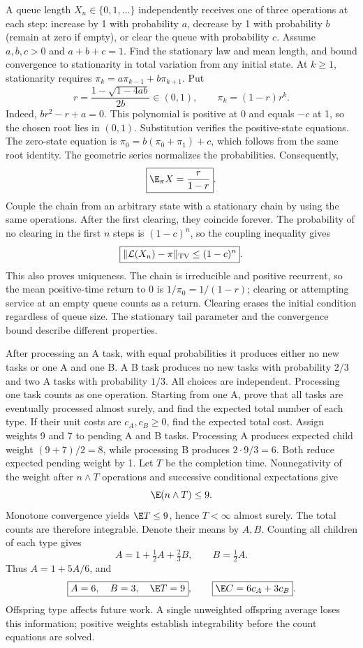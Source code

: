A queue length $X_n\in\{0,1,\ldots\}$ independently receives one of three operations at each step: increase by 1 with probability $a$, decrease by 1 with probability $b$ (remain at zero if empty), or clear the queue with probability $c$. Assume $a,b,c>0$ and $a+b+c=1$. Find the stationary law and mean length, and bound convergence to stationarity in total variation from any initial state.
\solution At $k\ge1$, stationarity requires $\pi_k=a\pi_{k-1}+b\pi_{k+1}$. Put
\[
 r=\frac{1-\sqrt{1-4ab}}{2b}\in(0,1),
 \qquad \boxed{\pi_k=(1-r)r^k}.
\]
Indeed, $br^2-r+a=0$. This polynomial is positive at 0 and equals $-c$ at 1, so the chosen root lies in $(0,1)$. Substitution verifies the positive-state equations. The zero-state equation is $\pi_0=b(\pi_0+\pi_1)+c$, which follows from the same root identity. The geometric series normalizes the probabilities. Consequently,
\[
 \boxed{\E_\pi X=\frac r{1-r}}.
\]
Couple the chain from an arbitrary state with a stationary chain by using the same operations. After the first clearing, they coincide forever. The probability of no clearing in the first $n$ steps is $(1-c)^n$, so the coupling inequality gives
\[
 \boxed{\|\mathcal L(X_n)-\pi\|_{\rm TV}\le(1-c)^n}.
\]
This also proves uniqueness. The chain is irreducible and positive recurrent, so the mean positive-time return to 0 is $1/\pi_0=1/(1-r)$; clearing or attempting service at an empty queue counts as a return.
\insight Clearing erases the initial condition regardless of queue size. The stationary tail parameter and the convergence bound describe different properties.

After processing an A task, with equal probabilities it produces either no new tasks or one A and one B. A B task produces no new tasks with probability $2/3$ and two A tasks with probability $1/3$. All choices are independent. Processing one task counts as one operation. Starting from one A, prove that all tasks are eventually processed almost surely, and find the expected total number of each type. If their unit costs are $c_A,c_B\ge0$, find the expected total cost.
\solution Assign weights 9 and 7 to pending A and B tasks. Processing A produces expected child weight $(9+7)/2=8$, while processing B produces $2\cdot9/3=6$. Both reduce expected pending weight by 1. Let $T$ be the completion time. Nonnegativity of the weight after $n\wedge T$ operations and successive conditional expectations give
\[
 \E(n\wedge T)\le9.
\]
Monotone convergence yields $\E T\le9$, hence $T<\infty$ almost surely. The total counts are therefore integrable. Denote their means by $A,B$. Counting all children of each type gives
\[
 A=1+\tfrac12A+\tfrac23B,\qquad B=\tfrac12A.
\]
Thus $A=1+5A/6$, and
\[
 \boxed{A=6,\quad B=3,\quad \E T=9},\qquad
 \boxed{\E C=6c_A+3c_B}.
\]
\insight Offspring type affects future work. A single unweighted offspring average loses this information; positive weights establish integrability before the count equations are solved.

